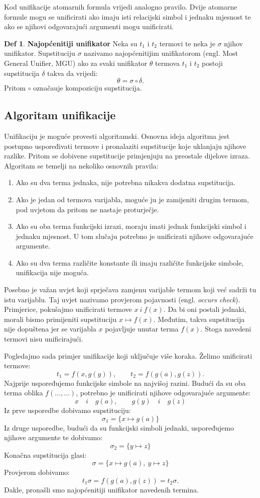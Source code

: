 \documentclass{article}
\theoremstyle{definition}
\newtheorem{definicija}{Def}[section]
\theoremstyle{plain}
\begin{document}
Kod unifikacije atomarnih formula vrijedi analogno pravilo. Dvije atomarne formule mogu se unificirati ako imaju isti relacijski simbol i jednaku mjesnost te ako se njihovi odgovarajući argumenti mogu unificirati.
\begin{definicija}\textbf{Najopćenitiji unifikator}\newline
Neka su \(t_1\) i \(t_2\) termovi te neka je \(\sigma\) njihov unifikator. Supstituciju \(\sigma\) nazivamo najopćenitijim unifikatorom (engl. Most General Unifier, MGU) ako za svaki unifikator \(\theta\) termova \(t_1\) i \(t_2\) postoji supstitucija \(\delta\) takva da vrijedi:
\[
\theta=\sigma\circ\delta.
\]
Pritom $\circ$ označauje kompoziciju supstitucija.
\end{definicija}
\subsection*{Algoritam unifikacije}
Unifikaciju je moguće provesti algoritamski. Osnovna ideja algoritma jest postupno uspoređivati termove i pronalaziti supstitucije koje uklanjaju njihove razlike. Pritom se dobivene supstitucije primjenjuju na preostale dijelove izraza.
Algoritam se temelji na nekoliko osnovnih pravila:

\begin{enumerate}
\item Ako su dva terma jednaka, nije potrebna nikakva dodatna supstitucija.
\item Ako je jedan od termova varijabla, moguće ju je zamijeniti drugim termom, pod uvjetom da pritom ne nastaje proturječje.
\item Ako su oba terma funkcijski izrazi, moraju imati jednak funkcijski simbol i jednaku mjesnost. U tom slučaju potrebno je unificirati njihove odgovarajuće argumente.
\item Ako su dva terma različite konstante ili imaju različite funkcijske simbole, unifikacija nije moguća.
\end{enumerate}
Posebno je važan uvjet koji sprječava zamjenu varijable termom koji već sadrži tu istu varijablu. Taj uvjet nazivamo provjerom pojavnosti (engl. \textit{occurs check}).
Primjerice, pokušajmo unificirati termove $x\:i\:f(x)$. Da bi oni postali jednaki, morali bismo primijeniti supstituciju $x\mapsto f(x)$. Međutim, takva supstitucija nije dopuštena jer se varijabla $x$ pojavljuje unutar terma $f(x)$. Stoga navedeni termovi nisu unificirajući.

Pogledajmo sada primjer unifikacije koji uključuje više koraka. Želimo unificirati termove:
\[
t_1=f(x,g(y)), \qquad t_2=f(g(a),g(z)).
\]
Najprije uspoređujemo funkcijske simbole na najvišoj razini. Budući da su oba terma oblika $f(\ldots,\ldots)$, potrebno je unificirati njihove odgovarajuće argumente:
\[
x \quad i \quad g(a), \qquad
g(y) \quad i \quad g(z)
\]
Iz prve usporedbe dobivamo supstituciju:
\[
\sigma_1=\{x\mapsto g(a)\}
\]
Iz druge usporedbe, budući da su funkcijski simboli jednaki, uspoređujemo njihove argumente te dobivamo:
\[
\sigma_2=\{y\mapsto z\}
\]
Konačna supstitucija glasi:
\[
\sigma=\{x\mapsto g(a),\ y\mapsto z\}
\]
Provjerom dobivamo:
\[
t_1\sigma=f(g(a),g(z))=t_2\sigma.
\]
Dakle, pronašli smo najopćenitiji unifikator navedenih termina.
\end{document}
